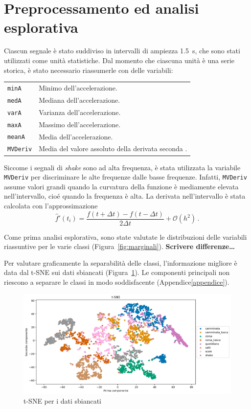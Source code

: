 \documentclass[./main.tex]{subfiles}
\begin{document}
\section{Preprocessamento ed analisi esplorativa}
Ciascun segnale è stato suddiviso in intervalli di ampiezza \SI{1.5}{s}, che sono stati utilizzati come unità statistiche. Dal momento che ciascuna unità è una serie storica, è stato necessario riassumerle con delle variabili:
\begin{table}[H]
	\centering
	\begin{tabular}{ll}
		\texttt{minA}& Minimo dell'accelerazione.\\
		\texttt{medA}& Mediana dell'accelerazione.\\
		\texttt{varA}& Varianza dell'accelerazione.\\
		\texttt{maxA}& Massimo dell'accelerazione.\\
		\texttt{meanA}& Media dell'accelerazione.\\
		\texttt{MVDeriv}& Media del valore assoluto della derivata seconda .
	\end{tabular}
\end{table}
Siccome i segnali di {\em shake} sono ad alta frequenza, è stata utilizzata la variabile \texttt{MVDeriv} per discriminare le alte frequenze dalle basse frequenze. Infatti, \texttt{MVDeriv} assume valori grandi quando la curvatura della funzione è mediamente elevata nell'intervallo, cioé quando la frequenza è alta. La derivata nell'intervallo è stata calcolata con l'approssimazione\cite{numpy_gradient}
\[
\hat{f}'(t_i) = \dfrac{f(t + \Delta t) - f(t - \Delta t)}{2\Delta t} + \mathcal{O}(h^2)\,.
\]

Come prima analisi esplorativa, sono state valutate le distribuzioni delle variabili riassuntive per le varie classi (Figura~\ref{fig:marginali}). \textbf{Scrivere differenze\dots}

Per valutare graficamente la separabilità delle classi, l'informazione migliore è data dal t-SNE sui dati sbiancati (Figura~\ref{fig:tsne}). Le componenti principali non riescono a separare le classi in modo soddisfacente (Appendice\ref{appendice}).
\begin{figure}[H]
	\centering
	\includegraphics[width=.8\textwidth]{../../figure/t-SNE.png}
	\caption{{ t-SNE per i dati sbiancati}}
	\label{fig:tsne}
\end{figure}
\end{document}
